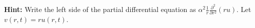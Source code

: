 \begin{fullwidth}
\begin{enumerate}
\vspace{0.25cm}

\noindent\textbf{Hint:} Write the left side of the partial differential equation as $\alpha^2\frac{1}{r}\frac{\partial^2}{\partial r^2}(ru)$.  Let $v(r,t) = ru(r,t)$.

\end{enumerate}



\end{fullwidth}
